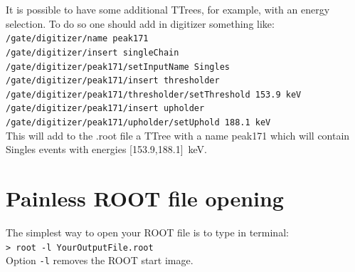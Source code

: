 \documentclass[12pt]{article}
\begin{document}
It is possible to have some additional TTrees, for example, with an energy selection. To do so one should add in digitizer something like: \\
\verb|/gate/digitizer/name peak171| \\
\verb|/gate/digitizer/insert singleChain| \\
\verb|/gate/digitizer/peak171/setInputName Singles| \\
\verb|/gate/digitizer/peak171/insert thresholder| \\
\verb|/gate/digitizer/peak171/thresholder/setThreshold 153.9 keV| \\
\verb|/gate/digitizer/peak171/insert upholder| \\
\verb|/gate/digitizer/peak171/upholder/setUphold 188.1 keV| \\
This will add to the .root file a TTree with a name peak171 which will contain Singles events with energies [153.9,188.1]~keV.
 

\section{Painless ROOT file opening}
The simplest way to open your ROOT file is to type in terminal:\\
\verb|> root -l YourOutputFile.root |\\
Option \verb|-l| removes the ROOT start image. 
\end{document}
